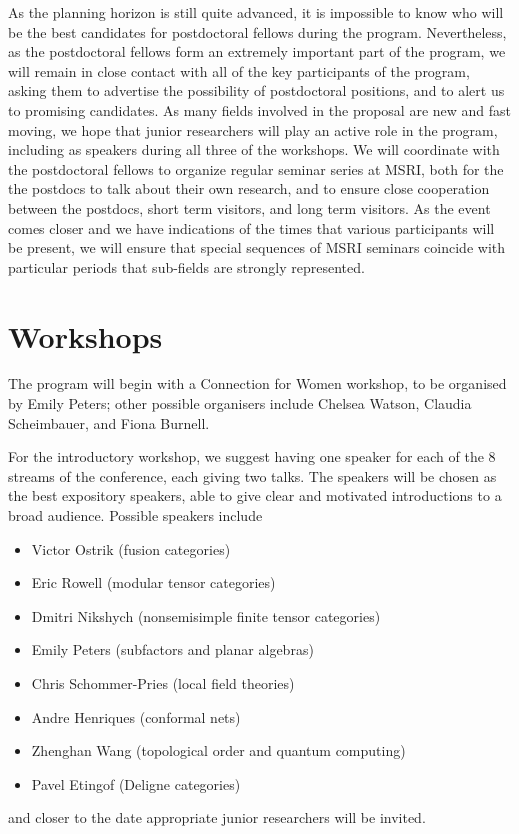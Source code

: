 \documentclass[11pt]{article}
\begin{document}
As the planning horizon is still quite advanced, it is impossible to know who will be the best candidates for postdoctoral fellows during the program. Nevertheless, as the postdoctoral fellows form an extremely important part of the program, we will remain in close contact with all of the key participants of the program, asking them to advertise the possibility of postdoctoral positions, and to alert us to promising candidates. As many fields involved in the proposal are new and fast moving, we hope that junior researchers will play an active role in the program, including as speakers during all three of the workshops. We will coordinate with the postdoctoral fellows to organize regular seminar series at MSRI, both for the the postdocs to talk about their own research, and to ensure close cooperation between the postdocs, short term visitors, and long term visitors. As the event comes closer and we have indications of the times that various participants will be present, we will ensure that special sequences of MSRI seminars coincide with particular periods that sub-fields are strongly represented. 

\section{Workshops}
The program will begin with a Connection for Women workshop, to be organised by Emily Peters; other possible organisers include Chelsea Watson, Claudia Scheimbauer, and Fiona Burnell. 

For the introductory workshop, we suggest having one speaker for each of the 8 streams of the conference, each giving two talks. The speakers will be chosen as the best expository speakers,
able to give clear and motivated introductions to a broad audience. Possible speakers include
\begin{itemize}
  \setlength{\itemsep}{1pt}
  \setlength{\parskip}{0pt}
  \setlength{\parsep}{0pt}
\item Victor Ostrik (fusion categories) 
\item Eric Rowell (modular tensor categories)
\item Dmitri Nikshych (nonsemisimple finite tensor categories) %
\item Emily Peters (subfactors and planar algebras) %
\item Chris Schommer-Pries (local field theories) %
\item Andre Henriques (conformal nets) %
\item Zhenghan Wang (topological order and quantum computing) %
\item Pavel Etingof (Deligne categories)
\end{itemize}
and closer to the date appropriate junior researchers will be invited. 
\end{document}
